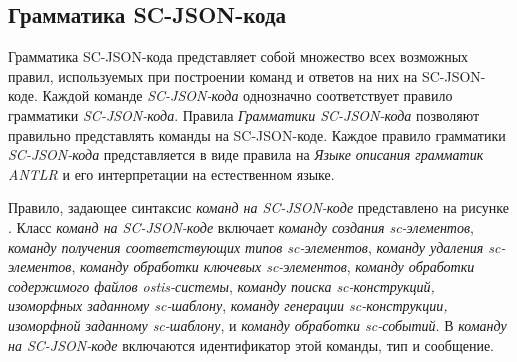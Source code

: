 \subsection{Грамматика SC-JSON-кода}
\label{sec_soft_platform_sc_json_code_grammar}

Грамматика SC-JSON-кода представляет собой множество всех возможных правил, используемых при построении команд и ответов на них на SC-JSON-коде. Каждой команде \textit{SC-JSON-кода} однозначно соответствует правило грамматики \textit{SC-JSON-кода}. Правила \textit{Грамматики SC-JSON-кода} позволяют правильно представлять команды на SC-JSON-коде. Каждое правило грамматики \textit{SC-JSON-кода} представляется в виде правила на \textit{Языке описания грамматик ANTLR} и его интерпретации на естественном языке.

\begin{SCn}
\begin{scnindent}
\end{scnindent}
\begin{scnindent}
\end{scnindent}
\begin{scnindent}
\end{scnindent}
\begin{scnindent}
\end{scnindent}
\end{SCn}

Правило, задающее синтаксис \textit{команд на SC-JSON-коде} представлено на рисунке . Класс \textit{команд на SC-JSON-коде} включает \textit{команду создания sc-элементов}, \textit{команду получения соответствующих типов sc-элементов}, \textit{команду удаления sc-элементов}, \textit{команду обработки ключевых sc-элементов}, \textit{команду обработки содержимого файлов ostis-системы}, \textit{команду поиска sc-конструкций, изоморфных заданному sc-шаблону}, \textit{команду генерации sc-конструкции, изоморфной заданному sc-шаблону}, и \textit{команду обработки sc-событий}. В \textit{команду на SC-JSON-коде} включаются идентификатор этой команды, тип и сообщение.

